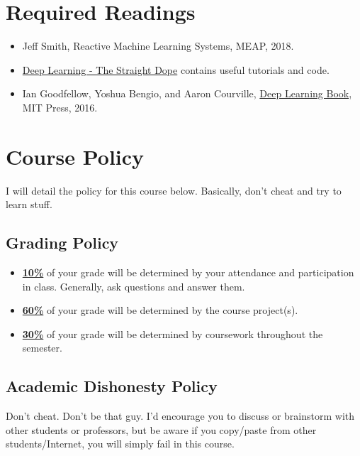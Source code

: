 \documentclass[11pt]{article}
\begin{document}
\section*{Required Readings}

\begin{itemize}
\item Jeff Smith, Reactive Machine Learning Systems, MEAP, 2018.
\item \href{https://gluon.mxnet.io/}{Deep Learning - The Straight Dope} contains useful tutorials and code.
\item Ian Goodfellow, Yoshua Bengio, and Aaron Courville, \href{http://www.deeplearningbook.org/}{Deep Learning Book}, MIT Press, 2016.
\end{itemize} 


\section*{Course Policy}

I will detail the policy for this course below. Basically, don't cheat and try to learn stuff.

\subsection*{Grading Policy}
\begin{itemize}
  \item \underline{\textbf{10\%}} of your grade will be determined by your attendance and participation in class. Generally, ask questions and answer them.

  \item \underline{\textbf{60\%}} of your grade will be determined by the course project(s). 

  \item \underline{\textbf{30\%}} of your grade will be determined by coursework throughout the semester.

\end{itemize}

\subsection*{Academic Dishonesty Policy}

Don't cheat. Don't be that guy. I'd encourage you to discuss or brainstorm with other students or professors, but be aware if you copy/paste from other students/Internet, you will simply fail in this course. 
\end{document}
